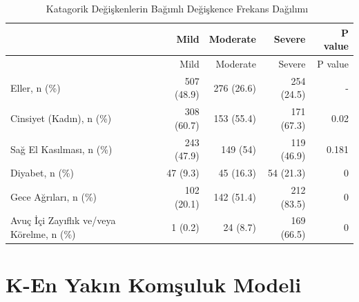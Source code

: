 \documentclass[12pt,twoside]{deuthesis}
\begin{document}
\begin{longtable}[]{@{}lrrrr@{}}
\caption{\label{tab:catvar} Katagorik Değişkenlerin Bağımlı Değişkence Frekans Dağılımı~}\tabularnewline
\toprule
& Mild & Moderate & Severe & P value \\
\midrule
\endfirsthead
\toprule
& Mild & Moderate & Severe & P value \\
\midrule
\endhead
Eller, n (\%) & 507 (48.9) & 276 (26.6) & 254 (24.5) & - \\
Cinsiyet (Kadın), n (\%) & 308 (60.7) & 153 (55.4) & 171 (67.3) & 0.02 \\
Sağ El Kasılması, n (\%) & 243 (47.9) & 149 (54) & 119 (46.9) & 0.181 \\
Diyabet, n (\%) & 47 (9.3) & 45 (16.3) & 54 (21.3) & 0 \\
Gece Ağrıları, n (\%) & 102 (20.1) & 142 (51.4) & 212 (83.5) & 0 \\
Avuç İçi Zayıflık ve/veya Körelme, n (\%) & 1 (0.2) & 24 (8.7) & 169 (66.5) & 0 \\
\bottomrule
\end{longtable}
\hypertarget{k-en-yakux131n-komux15fuluk-modeli}{%
\section{K-En Yakın Komşuluk Modeli}\label{k-en-yakux131n-komux15fuluk-modeli}}
\end{document}
